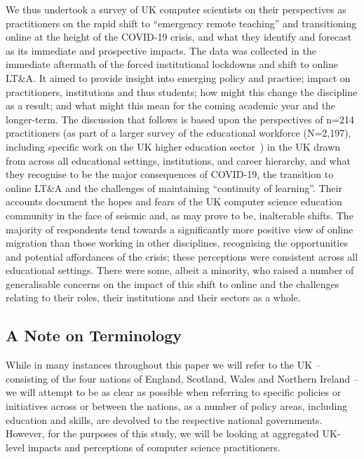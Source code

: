 \documentclass[sigconf]{acmart}
\begin{document}
We thus undertook a survey of UK computer scientists on their
perspectives as practitioners on the rapid shift to ``emergency remote
teaching'' and transitioning online at the height of the COVID-19
crisis, and what they identify and forecast as its immediate and
prospective impacts. The data was collected in the immediate aftermath
of the forced institutional lockdowns and shift to online LT\&A. It
aimed to provide insight into emerging policy and practice; impact on
practitioners, institutions and thus students; how might this change
the discipline as a result; and what might this mean for the coming
academic year and the longer-term.  The discussion that follows is
based upon the perspectives of n=214 practitioners (as part of a
larger survey of the educational workforce (N=2,197), including
specific work on the UK higher education
sector~\cite{watermeyer-et-al:he2020}) in the UK drawn from across all
educational settings, institutions, and career hierarchy, and what
they recognise to be the major consequences of COVID-19, the
transition to online LT\&A and the challenges of maintaining
``continuity of learning''. Their accounts document the hopes and
fears of the UK computer science education community in the face of
seismic and, as may prove to be, inalterable shifts. The majority of
respondents tend towards a significantly more positive view of online
migration than those working in other disciplines, recognising the
opportunities and potential affordances of the crisis; these
perceptions were consistent across all educational settings. There
were some, albeit a minority, who raised a number of generalisable
concerns on the impact of this shift to online and the challenges
relating to their roles, their institutions and their sectors as a
whole.

\subsection{A Note on Terminology}

While in many instances throughout this paper we will refer to the UK
-- consisting of the four nations of England, Scotland, Wales and
Northern Ireland -- we will attempt to be as clear as possible when
referring to specific policies or initiatives across or between the
nations, as a number of policy areas, including education and skills,
are devolved to the respective national governments. However, for the
purposes of this study, we will be looking at aggregated UK-level
impacts and perceptions of computer science practitioners.
\end{document}
